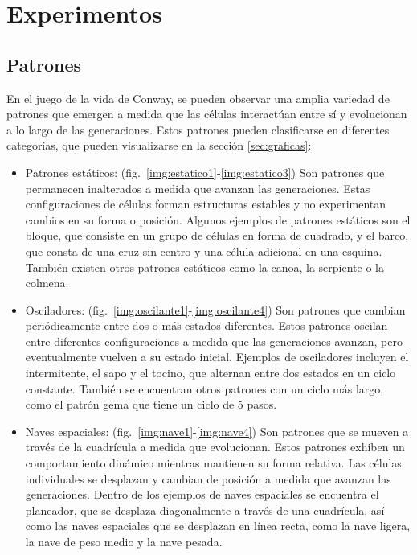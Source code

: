 \documentclass[12pt]{article}
\begin{document}
\section{Experimentos}


\subsection*{Patrones}

En el juego de la vida de Conway, se pueden observar una amplia variedad de patrones que emergen a medida que las células interactúan entre sí y evolucionan a lo largo de las generaciones. Estos patrones pueden clasificarse en diferentes categorías, que pueden visualizarse en la sección \ref{sec:graficas}:

\begin{itemize}
  \item Patrones estáticos: (fig.~\ref{img:estatico1}-\ref{img:estatico3}) Son patrones que permanecen inalterados a medida que avanzan las generaciones. Estas configuraciones de células forman estructuras estables y no experimentan cambios en su forma o posición. Algunos ejemplos de patrones estáticos son el bloque, que consiste en un grupo de células en forma de cuadrado, y el barco, que consta de una cruz sin centro y una célula adicional en una esquina. También existen otros patrones estáticos como la canoa, la serpiente o la colmena.

  \item Osciladores: (fig.~\ref{img:oscilante1}-\ref{img:oscilante4}) Son patrones que cambian periódicamente entre dos o más estados diferentes. Estos patrones oscilan entre diferentes configuraciones a medida que las generaciones avanzan, pero eventualmente vuelven a su estado inicial. Ejemplos de osciladores incluyen el intermitente, el sapo y el tocino, que alternan entre dos estados en un ciclo constante. También se encuentran otros patrones con un ciclo más largo, como el patrón gema que tiene un ciclo de 5 pasos.

  \item Naves espaciales: (fig.~\ref{img:nave1}-\ref{img:nave4}) Son patrones que se mueven a través de la cuadrícula a medida que evolucionan. Estos patrones exhiben un comportamiento dinámico mientras mantienen su forma relativa. Las células individuales se desplazan y cambian de posición a medida que avanzan las generaciones. Dentro de los ejemplos de naves espaciales se encuentra el planeador, que se desplaza diagonalmente a través de una cuadrícula, así como las naves espaciales que se desplazan en línea recta, como la nave ligera, la nave de peso medio y la nave pesada.
\end{itemize}
\end{document}
